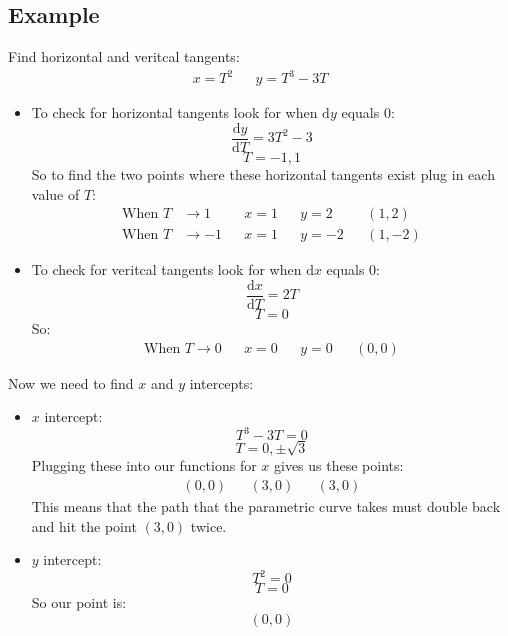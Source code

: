 \documentclass{report}
\begin{document}
    \subsection{Example}
        Find horizontal and veritcal tangents:
        \begin{align*}
            x = T^2 &&
            y = T^3 - 3T
        \end{align*}
        \begin{itemize}
            \item To check for horizontal tangents look for when \(\mathrm{d}y\) equals 0:
            \[\frac{\mathrm{d}y}{\mathrm{d}T} = 3T^2 - 3\]
            \[T = -1, 1\]
            So to find the two points where these horizontal tangents exist plug in each value of \(T\):
            \begin{align*}
                \text{When } T &\to 1 &&
                x = 1 &&
                y = 2 &&
                (1,2) \\
                \text{When } T &\to -1 &&
                x = 1 &&
                y = -2 &&
                (1,-2)
            \end{align*}
            \item To check for veritcal tangents look for when \(\mathrm{d}x\) equals 0:
            \[\frac{\mathrm{d}x}{\mathrm{d}T} = 2T\]
            \[T = 0\]
            So:
            \begin{align*}
                \text{When } T \to 0 &&
                x = 0 &&
                y = 0 &&
                (0,0)
            \end{align*}
        \end{itemize}
        Now we need to find \(x\) and \(y\) intercepts:
        \begin{itemize}
            \item \(x\) intercept:
            \[T^3 - 3T = 0\]
            \[T = 0, \pm \sqrt{3}\]
            Plugging these into our functions for \(x\) gives us these points:
            \begin{align*}
                (0, 0) &&
                (3, 0) &&
                (3, 0)
            \end{align*}
            This means that the path that the parametric curve takes must double back and hit the point \((3, 0)\) twice.
            \item \(y\) intercept:
            \[T^2 = 0\]
            \[T = 0\]
            So our point is:
            \[(0, 0)\]
        \end{itemize}
        
\end{document}
